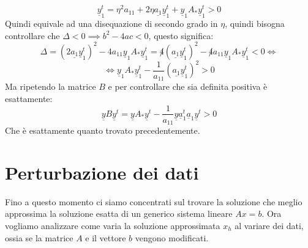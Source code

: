 \begin{itemize}
\begin{equation*}
              \underline{y}_1^t = \eta^2 a_{11}+2\eta\underline{a_1}\underline{y}_1^t +
              \underline{y}_1 A_\ast \underline{y}_1^t>0
          \end{equation*}
          Quindi equivale ad una disequazione di secondo grado in $\eta$, quindi
          bisogna controllare che $\Delta < 0\implies b^2-4ac<0$, questo significa:
          \begin{equation*}
              \Delta =(2\underline{a_1}\underline{y}_1^t)^2 -4a_{11}
              \underline{y}_1 A_\ast \underline{y}_1^t = \not 4(\underline{a_1}
              \underline{y}_1^t)^2 -\not 4 a_{11} \underline{y}_1 A_\ast \underline{y}_1^t
              < 0\iff
          \end{equation*}
          \begin{equation*}
              \iff \underline{y}_1 A_\ast \underline{y}_1^t - \frac{1}{a_{11}}
              (\underline{a_1}\underline{y}_1^t)^2>0
          \end{equation*}
          Ma ripetendo la matrice $B$ e per controllare che sia definita positiva
          è esattamente:
          \begin{equation*}
              \underline{y}B\underline{y}^t=\underline{y}A_\ast\underline{y}^t -
              \frac{1}{a_{11}} \underline{y}\underline{a}_1^t \underline{a}_1\underline{y}^t >0
          \end{equation*}
          Che è esattamente quanto trovato precedentemente.
\end{itemize}
\section{Perturbazione dei dati}
Fino a questo momento ci siamo concentrati sul trovare la soluzione che meglio
approssima la soluzione esatta di un generico sistema lineare $Ax=b$. Ora vogliamo
analizzare come varia la soluzione approssimata $x_h$ al variare dei dati, ossia
se la matrice $A$ e il vettore $b$ vengono modificati.

